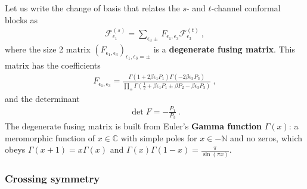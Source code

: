 \documentclass[12pt, a4paper]{article}
\newcommand{\myindex}[1]{\textbf{\boldmath #1}}
\theoremstyle{break}
\begin{document}
Let us write 
the change of basis that relates the $s$- and $t$-channel conformal blocks as 
\begin{align}
 \mathcal{F}^{(s)}_{\epsilon_1} = \sum_{\epsilon_3\pm} F_{\epsilon_1,\epsilon_3} \mathcal{F}^{(t)}_{\epsilon_3}\ , 
 \label{fsfft}
\end{align}
where the size 2 matrix $\left(F_{\epsilon_1,\epsilon_3}\right)_{\epsilon_1,\epsilon_3=\pm}$ is a \myindex{degenerate fusing matrix}. This matrix has the coefficients 
\begin{align}
 \boxed{F_{\epsilon_1,\epsilon_3} = \frac{\Gamma(1+2\beta\epsilon_1P_1)\Gamma(-2\beta \epsilon_3P_3)}{\prod_\pm \Gamma(\frac12 +\beta \epsilon_1P_1 \pm \beta P_2 -\beta \epsilon_3P_3)}}\ ,
 \label{fee}
\end{align}
and the determinant 
\begin{align}
 \det F = -\frac{P_1}{P_3}\ .
 \label{detf}
\end{align}
The degenerate fusing matrix is built from Euler's \myindex{Gamma function} $\Gamma(x)$: a meromorphic function of $x\in\mathbb{C}$ with simple poles for $x\in -\mathbb{N}$ and no zeros, which obeys $\Gamma(x+1)=x\Gamma(x)$ and $\Gamma(x)\Gamma(1-x)=\frac{\pi}{\sin(\pi x)}$. 

\subsubsection{Crossing symmetry}
\end{document}
